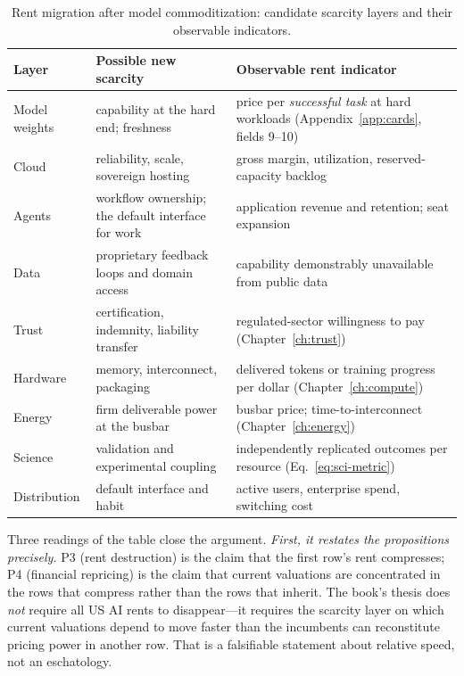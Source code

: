 \begin{table}[htbp]
  \centering
  \small
  \caption{Rent migration after model commoditization: candidate scarcity layers and their observable indicators.}
  \label{tab:rent-migration}
  \begin{tabular}{p{24mm}p{52mm}p{58mm}}
    \toprule
    Layer & Possible new scarcity & Observable rent indicator \\
    \midrule
    Model weights & capability at the hard end; freshness & price per \emph{successful task} at hard workloads (Appendix~\ref{app:cards}, fields 9--10) \\
    \addlinespace
    Cloud & reliability, scale, sovereign hosting & gross margin, utilization, reserved-capacity backlog \\
    \addlinespace
    Agents & workflow ownership; the default interface for work & application revenue and retention; seat expansion \\
    \addlinespace
    Data & proprietary feedback loops and domain access & capability demonstrably unavailable from public data \\
    \addlinespace
    Trust & certification, indemnity, liability transfer & regulated-sector willingness to pay (Chapter~\ref{ch:trust}) \\
    \addlinespace
    Hardware & memory, interconnect, packaging & delivered tokens or training progress per dollar (Chapter~\ref{ch:compute}) \\
    \addlinespace
    Energy & firm deliverable power at the busbar & busbar price; time-to-interconnect (Chapter~\ref{ch:energy}) \\
    \addlinespace
    Science & validation and experimental coupling & independently replicated outcomes per resource (Eq.~\ref{eq:sci-metric}) \\
    \addlinespace
    Distribution & default interface and habit & active users, enterprise spend, switching cost \\
    \bottomrule
  \end{tabular}
\end{table}

Three readings of the table close the argument. \emph{First, it restates the propositions precisely.} P3 (rent destruction) is the claim that the first row's rent compresses; P4 (financial repricing) is the claim that current valuations are concentrated in the rows that compress rather than the rows that inherit. The book's thesis does \emph{not} require all US AI rents to disappear---it requires the scarcity layer on which current valuations depend to move faster than the incumbents can reconstitute pricing power in another row. That is a falsifiable statement about relative speed, not an eschatology.

